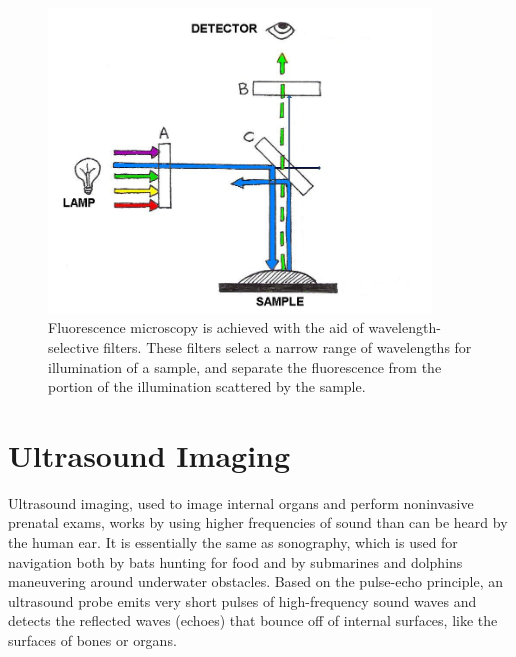 \begin{figure}[!htb]
	\centering
	\includegraphics[width=4.0in]{./figures/Topic10/Fig10-2.jpg}
	\caption{ Fluorescence microscopy is achieved with the aid of wavelength-selective filters.  These filters select a narrow range of wavelengths for illumination of a sample, and separate the fluorescence from the portion of the illumination scattered by the sample.}
	\label{Fig10-2}
\end{figure} 

\section{Ultrasound Imaging}

Ultrasound imaging, used to image internal organs and perform noninvasive prenatal exams, works by using higher frequencies of sound than can be heard by the human ear.  It is essentially the same as sonography, which is used for navigation both by bats hunting for food and by submarines and dolphins maneuvering around underwater obstacles.  Based on the pulse-echo principle, an ultrasound probe emits very short pulses of high-frequency sound waves and detects the reflected waves (echoes) that bounce off of internal surfaces, like the surfaces of bones or organs.

